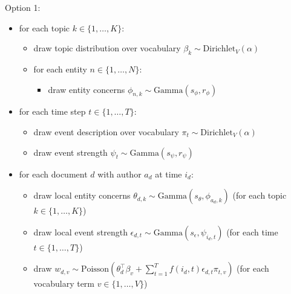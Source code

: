 

Option 1:
\begin{itemize}
\item for each topic $k \in \{1,\dots, K\}$:
	\begin{itemize}
	\item draw topic distribution over vocabulary $\beta_k \sim \mbox{Dirichlet}_V (\alpha)$
	\item for each entity $n \in \{1,\dots, N\}$:
		\begin{itemize}
		\item draw entity concerns $\phi_{n,k} \sim \mbox{Gamma}(s_\phi, r_\phi)$
		\end{itemize}
	\end{itemize}
\item for each time step $t \in \{1,\dots, T\}$:
	\begin{itemize}
	\item draw event description over vocabulary $\pi_t \sim \mbox{Dirichlet}_V (\alpha)$
	\item draw event strength $\psi_{t} \sim \mbox{Gamma}(s_\psi, r_\psi)$
	\end{itemize}
\item for each document $d$ with author $a_d$ at time $i_d$:
	\begin{itemize}
	\item draw local entity concerns $\theta_{d,k} \sim \mbox{Gamma}(s_\theta, \phi_{a_d,k})$ (for each topic $k \in \{1,\dots, K\}$)
	\item draw local event strength $\epsilon_{d,t} \sim \mbox{Gamma}(s_\epsilon, \psi_{i_d,t})$ (for each time $t \in \{1,\dots, T\}$)
	\item draw $w_{d,v} \sim \mbox{Poisson}(\theta_d^\top\beta_v + \sum_{t=1}^T f(i_d, t) \epsilon_{d,t} \pi_{t,v} )$ (for each vocabulary term $v \in \{1,\dots,V\}$)
	\end{itemize}
\end{itemize}

